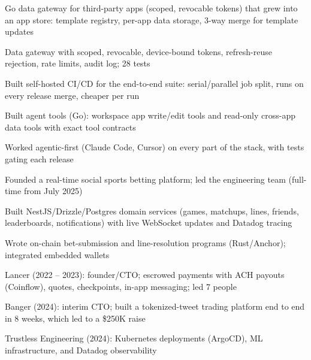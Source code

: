 \documentclass[print]{jack-resume}
\begin{document}
\begin{tightemize}
    \item Go data gateway for third-party apps (scoped, revocable tokens) that grew into an app store: template registry, per-app data storage, 3-way merge for template updates
    \item Data gateway with scoped, revocable, device-bound tokens, refresh-reuse rejection, rate limits, audit log; 28 tests
    \item Built self-hosted CI/CD for the end-to-end suite: serial/parallel job split, runs on every release merge, cheaper per run
    \item Built agent tools (Go): workspace app write/edit tools and read-only cross-app data tools with exact tool contracts
    \item Worked agentic-first (Claude Code, Cursor) on every part of the stack, with tests gating each release
\end{tightemize}
\sectionsep

\begin{tightemize}
    \item Founded a real-time social sports betting platform; led the engineering team (full-time from July 2025)
    \item Built NestJS/Drizzle/Postgres domain services (games, matchups, lines, friends, leaderboards, notifications) with live WebSocket updates and Datadog tracing
    \item Wrote on-chain bet-submission and line-resolution programs (Rust/Anchor); integrated embedded wallets
\end{tightemize}
\sectionsep

\begin{tightemize}
    \item Lancer (2022 -- 2023): founder/CTO; escrowed payments with ACH payouts (Coinflow), quotes, checkpoints, in-app messaging; led 7 people
    \item Banger (2024): interim CTO; built a tokenized-tweet trading platform end to end in 8 weeks, which led to a \$250K raise
    \item Trustless Engineering (2024): Kubernetes deployments (ArgoCD), ML infrastructure, and Datadog observability
\end{tightemize}
\sectionsep
\end{document}
